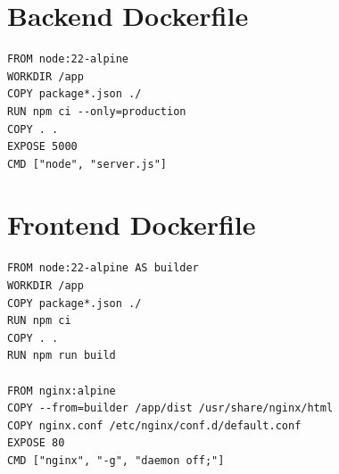 \section{Backend Dockerfile}
\label{sec:backend-dockerfile}
\begin{lstlisting}[style=codeStyle, caption=backend/Dockerfile]
FROM node:22-alpine
WORKDIR /app
COPY package*.json ./
RUN npm ci --only=production
COPY . .
EXPOSE 5000
CMD ["node", "server.js"]
\end{lstlisting}

\section{Frontend Dockerfile}
\label{sec:frontend-dockerfile}
\begin{lstlisting}[style=codeStyle, caption=frontend/Dockerfile]
FROM node:22-alpine AS builder
WORKDIR /app
COPY package*.json ./
RUN npm ci
COPY . .
RUN npm run build

FROM nginx:alpine
COPY --from=builder /app/dist /usr/share/nginx/html
COPY nginx.conf /etc/nginx/conf.d/default.conf
EXPOSE 80
CMD ["nginx", "-g", "daemon off;"]
\end{lstlisting}